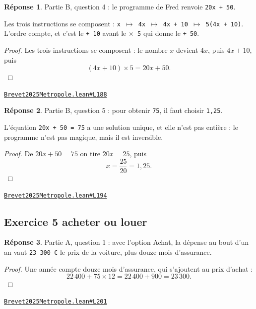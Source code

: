 \documentclass[11pt,a4paper]{article}
\theoremstyle{definition}
\theoremstyle{plain}
\theoremstyle{definition}
\newtheorem*{reponse}{Réponse}
\newcommand{\source}[2]{\par\smallskip\noindent\hfill{\footnotesize\href{#1}{\texttt{#2}}}\par\smallskip}
\begin{document}
\begin{reponse}
Partie B, question 4 : le programme de Fred renvoie \texttt{20x + 50}.

Les trois instructions se composent : \texttt{x \(\mapsto\) 4x \(\mapsto\) 4x + 10 \(\mapsto\) 5(4x + 10)}. L'ordre
compte, et c'est le \texttt{+ 10} avant le \texttt{\(\times\) 5} qui donne le \texttt{+ 50}.
\end{reponse}
\begin{proof}
Les trois instructions se composent : le nombre $x$ devient $4x$, puis $4x + 10$, puis
\[ (4x + 10) \times 5 = 20x + 50 . \]
\end{proof}
\source{https://github.com/Commutator-IO/learn-lean/blob/main/exams/2025/Brevet2025Metropole.lean\#L188}{Brevet2025Metropole.lean\#L188}

\begin{reponse}
Partie B, question 5 : pour obtenir \texttt{75}, il faut choisir \texttt{1,25}.

L'équation \texttt{20x + 50 = 75} a une solution unique, et elle n'est pas entière : le
programme n'est pas magique, mais il est inversible.
\end{reponse}
\begin{proof}
De $20x + 50 = 75$ on tire $20x = 25$, puis
\[ x = \frac{25}{20} = 1{,}25 . \]
\end{proof}
\source{https://github.com/Commutator-IO/learn-lean/blob/main/exams/2025/Brevet2025Metropole.lean\#L194}{Brevet2025Metropole.lean\#L194}

\subsection{Exercice 5 \textemdash{} acheter ou louer}

\begin{reponse}
Partie A, question 1 : avec l'option Achat, la dépense au bout d'un an vaut
\texttt{23 300 €} \textemdash{} le prix de la voiture, plus douze mois d'assurance.
\end{reponse}
\begin{proof}
Une année compte douze mois d'assurance, qui s'ajoutent au prix d'achat :
\[ 22\,400 + 75 \times 12 = 22\,400 + 900 = 23\,300 . \]
\end{proof}
\source{https://github.com/Commutator-IO/learn-lean/blob/main/exams/2025/Brevet2025Metropole.lean\#L201}{Brevet2025Metropole.lean\#L201}
\end{document}

